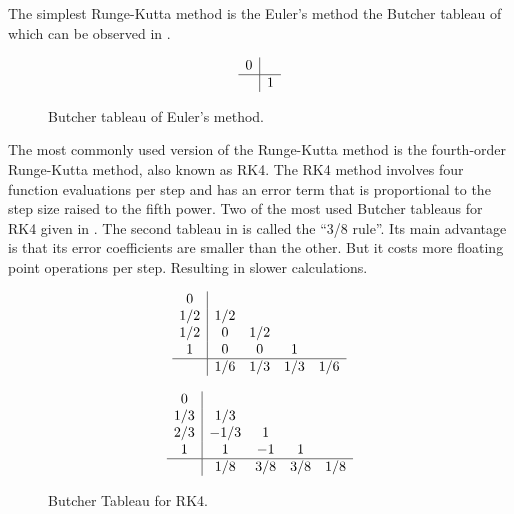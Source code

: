 \documentclass[a4paper,oneside,12pt]{report}
\numberwithin{equation}{chapter}
\begin{document}
The simplest Runge-Kutta method is the Euler's method the Butcher tableau of which can be observed in .

\begin{figure}[h!]
\[ 
    \begin{array} 
        {c|cccc}
        0\\
        \hline
        & 1
    \end{array}
\] 
\caption{Butcher tableau of Euler's method.}
\label{fig:Butcher_euler}
\end{figure}

The most commonly used version of the Runge-Kutta method is the fourth-order Runge-Kutta method, also known as RK4. 
The RK4 method involves four function evaluations per step and has an error term that is proportional to the step size raised to the fifth power.
Two of the most used Butcher tableaus for RK4 given in .
The second tableau in  is called the ``3/8 rule''. Its main advantage is that its error coefficients are smaller than the other. But it costs more floating point operations per step. 
Resulting in slower calculations. 

\begin{figure}[h!]
    \centering
    \begin{minipage}{.5\textwidth}
        \[ 
        \begin{array} 
            {c|cccc}
            0\\
            1/2 & 1/2 \\
            1/2 & 0 & 1/2 \\
            1   & 0 & 0 & 1\\
            \hline
            & 1/6 & 1/3 & 1/3 & 1/6
        \end{array}
        \]  
    \end{minipage}%
    \begin{minipage}{.5\textwidth}
        \[ 
        \begin{array} 
            {c|cccc}
            0\\
            1/3 & 1/3 \\
            2/3 & -1/3 & 1 \\
            1   & 1 & -1 & 1\\
            \hline
            & 1/8 & 3/8 & 3/8 & 1/8
        \end{array}
        \]  
    \end{minipage}
    \vspace{20pt}
    \caption{Butcher Tableau for RK4.}
    \label{fig:Butcher-RK4}
\end{figure}
\end{document}
